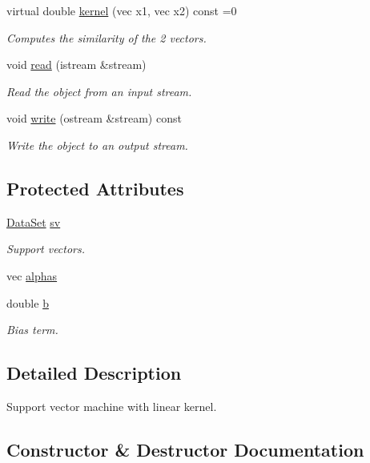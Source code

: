 \begin{DoxyCompactItemize}
virtual double \hyperlink{classhappyml_1_1SVM_a940caf4789e40d6a2b237184765a16ea}{kernel} (vec x1, vec x2) const  =0
\begin{DoxyCompactList}\small\item\em Computes the similarity of the 2 vectors. \end{DoxyCompactList}\item 
void \hyperlink{classhappyml_1_1SVM_a180e169777af513b76cada99044ad3c3}{read} (istream \&stream)
\begin{DoxyCompactList}\small\item\em Read the object from an input stream. \end{DoxyCompactList}\item 
void \hyperlink{classhappyml_1_1SVM_a71cdc4e06322b9555dbcc118b45c4f73}{write} (ostream \&stream) const 
\begin{DoxyCompactList}\small\item\em Write the object to an output stream. \end{DoxyCompactList}\end{DoxyCompactItemize}
\subsection*{Protected Attributes}
\begin{DoxyCompactItemize}
\item 
\hyperlink{classhappyml_1_1DataSet}{Data\+Set} \hyperlink{classhappyml_1_1SVM_aa6fca9de47d16e821964229f660a8cdd}{sv}
\begin{DoxyCompactList}\small\item\em Support vectors. \end{DoxyCompactList}\item 
vec \hyperlink{classhappyml_1_1SVM_ab25126e39d5dc413f6acb22cf1d25cc8}{alphas}
\item 
double \hyperlink{classhappyml_1_1SVM_a84a61489971f2b76c78587aff4782fdc}{b}
\begin{DoxyCompactList}\small\item\em Bias term. \end{DoxyCompactList}\end{DoxyCompactItemize}


\subsection{Detailed Description}
Support vector machine with linear kernel. 

\subsection{Constructor \& Destructor Documentation}
